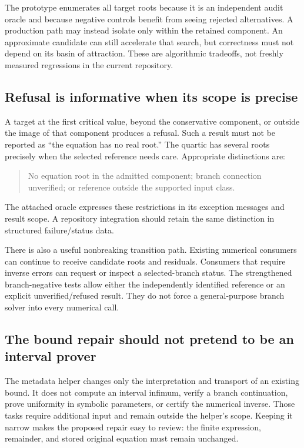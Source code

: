 \documentclass[11pt,letterpaper]{article}
\begin{document}
The prototype enumerates all target roots because it is an independent audit oracle and because negative controls benefit from seeing rejected alternatives. A production path may instead isolate only within the retained component. An approximate candidate can still accelerate that search, but correctness must not depend on its basin of attraction. These are algorithmic tradeoffs, not freshly measured regressions in the current repository.

\subsection{Refusal is informative when its scope is precise}

A target at the first critical value, beyond the conservative component, or outside the image of that component produces a refusal. Such a result must not be reported as ``the equation has no real root.'' The quartic has several roots precisely when the selected reference needs care. Appropriate distinctions are:
\begin{quote}
No equation root in the admitted component; branch connection unverified; or reference outside the supported input class.
\end{quote}
The attached oracle expresses these restrictions in its exception messages and result scope. A repository integration should retain the same distinction in structured failure/status data.

There is also a useful nonbreaking transition path. Existing numerical consumers can continue to receive candidate roots and residuals. Consumers that require inverse errors can request or inspect a selected-branch status. The strengthened branch-negative tests allow either the independently identified reference or an explicit unverified/refused result. They do not force a general-purpose branch solver into every numerical call.

\subsection{The bound repair should not pretend to be an interval prover}

The metadata helper changes only the interpretation and transport of an existing bound. It does not compute an interval infimum, verify a branch continuation, prove uniformity in symbolic parameters, or certify the numerical inverse. Those tasks require additional input and remain outside the helper's scope. Keeping it narrow makes the proposed repair easy to review: the finite expression, remainder, and stored original equation must remain unchanged.
\end{document}
